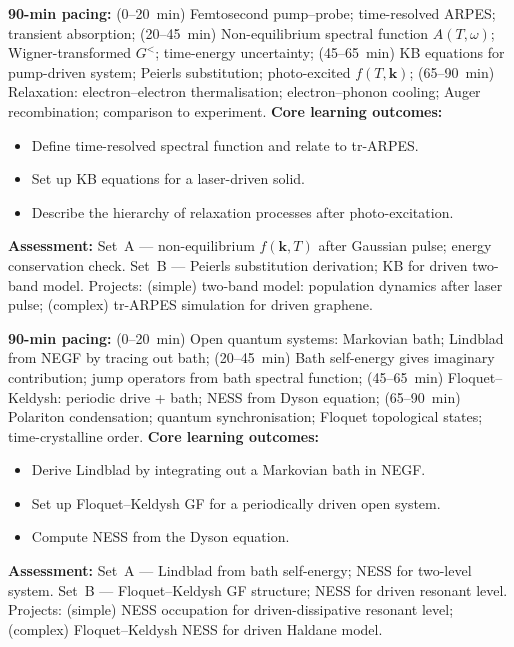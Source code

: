 \documentclass[11pt,a4paper]{article}
\begin{document}
\medskip

\begin{tcolorbox}[modulebox, title={Module~II.5 --- Lecture L10: Pump--Probe Dynamics}]
\textbf{90-min pacing:} (0--20~min) Femtosecond pump--probe; time-resolved ARPES; transient absorption; (20--45~min) Non-equilibrium spectral function $A(T,\omega)$; Wigner-transformed $G^<$; time-energy uncertainty; (45--65~min) KB equations for pump-driven system; Peierls substitution; photo-excited $f(T,\mathbf{k})$; (65--90~min) Relaxation: electron--electron thermalisation; electron--phonon cooling; Auger recombination; comparison to experiment.
\medskip\textbf{Core learning outcomes:}
\begin{itemize}[leftmargin=1.4em,topsep=2pt,itemsep=1pt]
  \item Define time-resolved spectral function and relate to tr-ARPES.
  \item Set up KB equations for a laser-driven solid.
  \item Describe the hierarchy of relaxation processes after photo-excitation.
\end{itemize}
\medskip\textbf{Assessment:}
Set~A --- non-equilibrium $f(\mathbf{k},T)$ after Gaussian pulse; energy conservation check.
Set~B --- Peierls substitution derivation; KB for driven two-band model.
Projects: (simple) two-band model: population dynamics after laser pulse; (complex) tr-ARPES simulation for driven graphene.
\end{tcolorbox}

\medskip

\begin{tcolorbox}[modulebox, title={Module~II.5 --- Lecture L11: Driven-Dissipative Systems}]
\textbf{90-min pacing:} (0--20~min) Open quantum systems: Markovian bath; Lindblad from NEGF by tracing out bath; (20--45~min) Bath self-energy gives imaginary contribution; jump operators from bath spectral function; (45--65~min) Floquet--Keldysh: periodic drive + bath; NESS from Dyson equation; (65--90~min) Polariton condensation; quantum synchronisation; Floquet topological states; time-crystalline order.
\medskip\textbf{Core learning outcomes:}
\begin{itemize}[leftmargin=1.4em,topsep=2pt,itemsep=1pt]
  \item Derive Lindblad by integrating out a Markovian bath in NEGF.
  \item Set up Floquet--Keldysh GF for a periodically driven open system.
  \item Compute NESS from the Dyson equation.
\end{itemize}
\medskip\textbf{Assessment:}
Set~A --- Lindblad from bath self-energy; NESS for two-level system.
Set~B --- Floquet--Keldysh GF structure; NESS for driven resonant level.
Projects: (simple) NESS occupation for driven-dissipative resonant level; (complex) Floquet--Keldysh NESS for driven Haldane model.
\end{tcolorbox}
\end{document}

